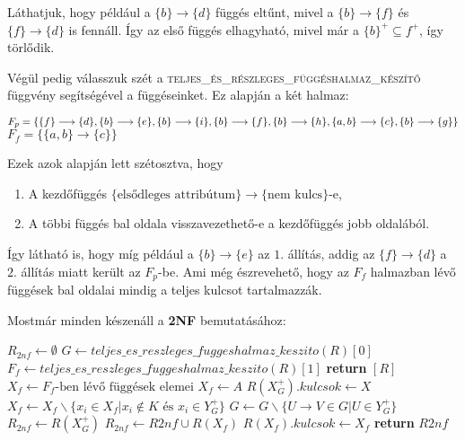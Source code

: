 \begin{pld}
Láthatjuk, hogy például a $\{b\} \longrightarrow \{d\}$ függés eltűnt, mivel a  $\{b\} \longrightarrow \{f\}$ és $\{f\} \longrightarrow \{d\}$ is fennáll. Így az első függés elhagyható, mivel már a $\{b\}^+ \subseteq {f}^+$, így törlődik. 

Végül pedig válasszuk szét a \textsc{teljes\_és\_részleges\_függéshalmaz\_készítő} függvény segítségével a függéseinket. Ez alapján a két halmaz:

\begin{center}
    $F_p = \{ \{f\} \longrightarrow \{d\}, 
    \{b\} \longrightarrow \{e\}, 
    \{b\} \longrightarrow \{i\},
    \{b\} \longrightarrow \{f\}, \break
    \{b\} \longrightarrow \{h\}, 
    \{a,b\} \longrightarrow \{c\}, 
    \{b\} \longrightarrow \{g\} \}$ \break
    $F_f = \{\{a,b\} \longrightarrow \{c\} \}$
\end{center}

Ezek azok alapján lett szétosztva, hogy
\begin{enumerate}
    \item A kezdőfüggés $\{ \text{elsődleges attribútum} \} \longrightarrow \{ \text{nem kulcs}\}$-e,
    \item A többi függés bal oldala visszavezethető-e a kezdőfüggés jobb oldalából.
\end{enumerate}

Így látható is, hogy míg például a $\{b\} \longrightarrow \{e\}$ az $1.$ állítás, addig az $\{f\} \longrightarrow \{d\}$ a $2.$ állítás miatt került az $F_p$-be. Ami még észrevehető, hogy az $F_f$ halmazban lévő függések bal oldalai mindig a teljes kulcsot tartalmazzák.
\end{pld}

Mostmár minden készenáll a \textbf{2NF} bemutatásához:

\begin{algorithmic}
        \State $R_{2nf} \gets \emptyset$
        \State $G \gets teljes\_es\_reszleges\_fuggeshalmaz\_keszito(R)[0]$
        \State $F_f \gets teljes\_es\_reszleges\_fuggeshalmaz\_keszito(R)[1]$
            \State \textbf{return} $[R]$
        \EndIf
            \State $X_f \gets F_f \text{-ben lévő függések elemei}$
        \Else
            \State $X_f \gets A$
        \EndIf
                \State $R(X^+_G).kulcsok \gets X$
                \State $X_f \gets X_f \backslash \{x_i \in X_f \big | x_i \not \in K \text{ és } x_i \in Y_G^+ \}$
                \State $G \gets G \backslash \{ U \rightarrow V \in G \big | U \in Y_G^+ \}$
                \State $R_{2nf} \gets R(X^+_G)$
            \EndIf
        \EndFor
        \State $R_{2nf} \gets R2nf \cup R(X_f)$
        \State $R(X_f).kulcsok \gets X_f$
        \State \textbf{return} $R2nf$
    \EndFunction
\end{algorithmic}

